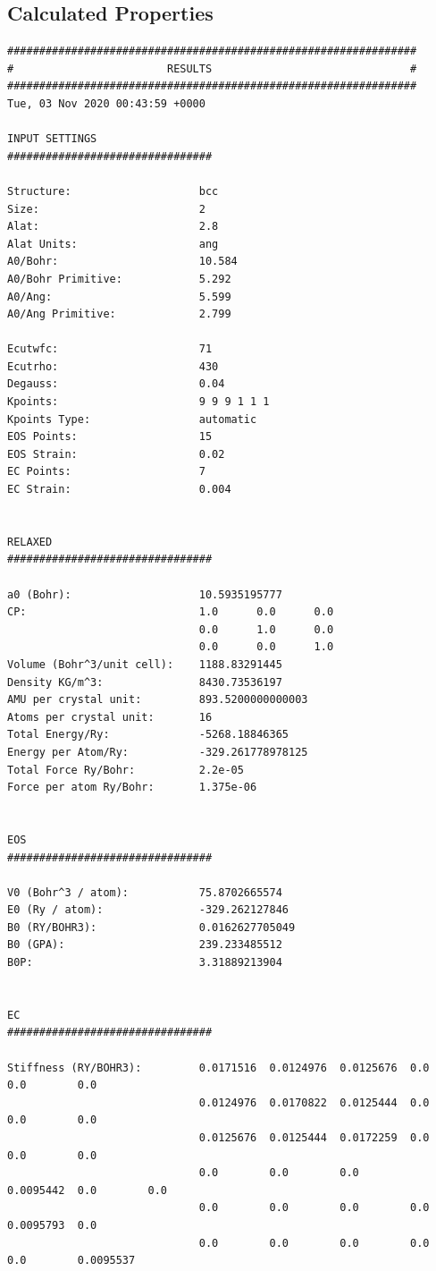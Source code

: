 \documentclass[12pt,twoside]{manual}
\begin{document}
\begin{appendices}
\subsection{Calculated Properties}

\begin{lstlisting}[style=inputfile,caption={Results File}]
################################################################
#                        RESULTS                               #
################################################################
Tue, 03 Nov 2020 00:43:59 +0000

INPUT SETTINGS
################################

Structure:                    bcc
Size:                         2
Alat:                         2.8
Alat Units:                   ang
A0/Bohr:                      10.584
A0/Bohr Primitive:            5.292
A0/Ang:                       5.599
A0/Ang Primitive:             2.799

Ecutwfc:                      71
Ecutrho:                      430
Degauss:                      0.04
Kpoints:                      9 9 9 1 1 1
Kpoints Type:                 automatic
EOS Points:                   15
EOS Strain:                   0.02
EC Points:                    7
EC Strain:                    0.004


RELAXED
################################

a0 (Bohr):                    10.5935195777
CP:                           1.0      0.0      0.0
                              0.0      1.0      0.0
                              0.0      0.0      1.0
Volume (Bohr^3/unit cell):    1188.83291445
Density KG/m^3:               8430.73536197
AMU per crystal unit:         893.5200000000003
Atoms per crystal unit:       16
Total Energy/Ry:              -5268.18846365
Energy per Atom/Ry:           -329.261778978125
Total Force Ry/Bohr:          2.2e-05
Force per atom Ry/Bohr:       1.375e-06


EOS
################################

V0 (Bohr^3 / atom):           75.8702665574
E0 (Ry / atom):               -329.262127846
B0 (RY/BOHR3):                0.0162627705049
B0 (GPA):                     239.233485512
B0P:                          3.31889213904


EC
################################

Stiffness (RY/BOHR3):         0.0171516  0.0124976  0.0125676  0.0        0.0        0.0       
                              0.0124976  0.0170822  0.0125444  0.0        0.0        0.0       
                              0.0125676  0.0125444  0.0172259  0.0        0.0        0.0       
                              0.0        0.0        0.0        0.0095442  0.0        0.0       
                              0.0        0.0        0.0        0.0        0.0095793  0.0       
                              0.0        0.0        0.0        0.0        0.0        0.0095537 


\end{lstlisting}
\end{appendices}
\end{document}
